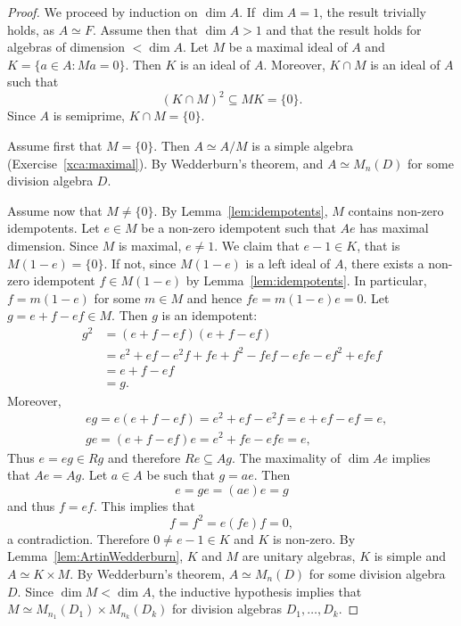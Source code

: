 \begin{proof}
    We proceed by induction on $\dim A$. If $\dim A=1$, the result trivially holds, as 
    $A\simeq F$. Assume
    then that $\dim A>1$ and that the result holds for algebras
    of dimension $<\dim A$. Let $M$ be a maximal ideal of $A$ and 
    $K=\{a\in A:Ma=0\}$. Then $K$ is an ideal of $A$. 
    Moreover, $K\cap M$ is an ideal of $A$
    such that 
    \[
    (K\cap M)^2\subseteq MK=\{0\}.
    \]
    Since $A$ is semiprime, $K\cap M=\{0\}$. 
 
    Assume first that $M=\{0\}$. Then $A\simeq A/M$ is a simple 
    algebra (Exercise~\ref{xca:maximal}). By Wedderburn's theorem, 
    and $A\simeq M_n(D)$ for some division algebra $D$. 
  
    Assume now that $M\ne\{0\}$. By Lemma~\ref{lem:idempotents}, 
    $M$ contains non-zero idempotents. 
    Let $e\in M$ be a non-zero idempotent
    such that $Ae$ has maximal dimension. Since $M$ is maximal, $e\ne 1$. We claim that 
    $e-1\in K$, that is $M(1-e)=\{0\}$. If not, 
    since $M(1-e)$ is a left ideal of $A$,  
    there exists a non-zero idempotent $f\in M(1-e)$  
    by Lemma~\ref{lem:idempotents}. 
    In particular, 
    $f=m(1-e)$ for some $m\in M$ and hence 
    $fe=m(1-e)e=0$. Let $g=e+f-ef\in M$. Then
    $g$ is an idempotent:
    \begin{align*}
    g^2 & =(e+f-ef)(e+f-ef)\\
    &=e^2+ef-e^2f+fe+f^2-fef-efe-ef^2+efef\\
    &=e+f-ef\\
    &=g.
    \end{align*}
    Moreover, 
	\begin{align*}
	&eg=e(e+f-ef)=e^2+ef-e^2f=e+ef-ef=e,\\
	&ge=(e+f-ef)e=e^2+fe-efe=e,
	\end{align*}
    Thus $e=eg\in Rg$ and therefore $Re\subseteq Ag$. The maximality of  
    $\dim Ae$ implies that $Ae=Ag$. Let $a\in A$ be such that $g=ae$. 
    Then
    \[
    e=ge=(ae)e=g
    \]
    and thus $f=ef$. This implies that
    \[
    f=f^2=e(fe)f=0,
    \]
    a contradiction. Therefore $0\ne e-1\in K$ and $K$ is non-zero. 
    By Lemma~\ref{lem:ArtinWedderburn}, $K$ and $M$ are unitary 
    algebras, $K$ is simple and $A\simeq K\times M$. By Wedderburn's theorem,
    $A\simeq M_{n}(D)$ for some division algebra $D$. Since 
    $\dim M<\dim A$, the inductive hypothesis implies that 
    $M\simeq M_{n_1}(D_1)\times M_{n_k}(D_k)$ for
    division algebras $D_1,\dots,D_k$. 
\end{proof}
